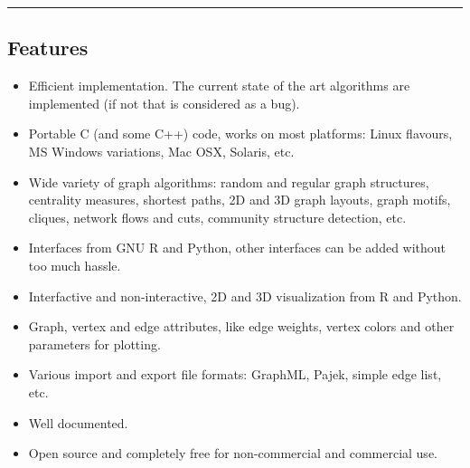 \documentclass[a3]{sciposter}
\begin{document}
\vspace*{-0.7cm}
\vfill
\hrule
\vfill
\vspace*{-0.3cm}
\begin{multicols}{3}

\RaggedRight


\section{Features}

\begin{itemize}
\item Efficient implementation. The current state of the art
  algorithms are implemented (if not that is considered as a bug).
\item Portable C (and some C++) code, works on most platforms:
  Linux flavours, MS Windows variations, Mac OSX, Solaris, etc.
\item Wide variety of graph algorithms: random and regular graph
  structures, centrality measures, shortest paths, 2D and 3D graph
  layouts, graph motifs, cliques, network flows and cuts, community
  structure detection, etc.
\item Interfaces from GNU R and Python, other interfaces can be added
  without too much hassle.
\item Interfactive and non-interactive, 2D and 3D
  visualization from R and Python.
\item Graph, vertex and edge attributes, like edge weights, vertex
  colors and other parameters for plotting.
\item Various import and export file formats: GraphML, Pajek, simple
  edge list, etc.
\item Well documented.
\item Open source and completely free for non-commercial and
  commercial use.
\end{itemize}


\end{multicols}
\end{document}
